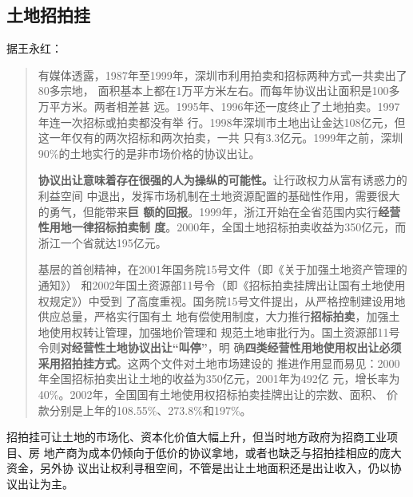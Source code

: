 
\subsection{土地招拍挂}
据王永红：
\begin{quotation}
  有媒体透露，1987年至1999年，深圳市利用拍卖和招标两种方式一共卖出了80多宗地，
  面积基本上都在1万平方米左右。而每年协议出让面积是100多万平方米。两者相差甚
  远。1995年、1996年还一度终止了土地拍卖。1997年连一次招标或拍卖都没有举
  行。1998年深圳市土地出让金达108亿元，但这一年仅有的两次招标和两次拍卖，一共
  只有3.3亿元。1999年之前，深圳90\%的土地实行的是非市场价格的协议出让。

  \textbf{协议出让意味着存在很强的人为操纵的可能性。}让行政权力从富有诱惑力的利益空间
  中退出，发挥市场机制在土地资源配置的基础性作用，需要很大的勇气，但能带来\textbf{巨
  额的回报}。1999年，浙江开始在全省范围内实行\textbf{经营性用地一律招标拍卖制
    度}。2000年，全国土地招标拍卖收益为350亿元，而浙江一个省就达195亿元。

  基层的首创精神，在2001年国务院15号文件（即《关于加强土地资产管理的通知》）
  和2002年国土资源部11号令（即《招标拍卖挂牌出让国有土地使用权规定》）中受到
  了高度重视。国务院15号文件提出，从严格控制建设用地供应总量，严格实行国有土
  地有偿使用制度，大力推行\textbf{招标拍卖}，加强土地使用权转让管理，加强地价管理和
  规范土地审批行为。国土资源部11号令则\textbf{对经营性土地协议出让“叫停”}，明
  确\textbf{四类经营性用地使用权出让必须采用招拍挂方式}。这两个文件对土地市场建设的
  推进作用显而易见：2000年全国招标拍卖出让土地的收益为350亿元，2001年为492亿
  元，增长率为40\%。2002年，全国国有土地使用权招标拍卖挂牌出让的宗数、面积、
  价款分别是上年的108.55\%、273.8\%和197\%。
\end{quotation}

招拍挂可让土地的市场化、资本化价值大幅上升，但当时地方政府为招商工业项目、房
地产商为成本仍倾向于低价的协议拿地，或者也缺乏与招拍挂相应的庞大资金，另外协
议出让权利寻租空间，不管是出让土地面积还是出让收入，仍以协议出让为主。

